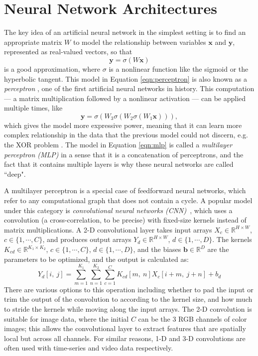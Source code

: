 \section{Neural Network Architectures}

The key idea of an artificial neural network in the simplest setting is to find an appropriate matrix $W$ to model the relationship between variables $\bm{x}$ and $\bm{y}$, represented as real-valued vectors, so that
\begin{equation}\label{eqn:perceptron}
	\bm{y} = \sigma(W \bm{x})
\end{equation}
is a good approximation, where $\sigma$ is a nonlinear function like the sigmoid or the hyperbolic tangent.
This model in Equation \ref{eqn:perceptron} is also known as a \emph{perceptron} \cite{rosenblatt1957perceptron}, one of the first artificial neural networks in history.
This computation --- a matrix multiplication followed by a nonlinear activation --- can be applied multiple times, like
\begin{equation}\label{eqn:mlp}
	\bm{y} = \sigma(W_3\sigma(W_2 \sigma(W_1 \bm{x}))),
\end{equation}
which gives the model more expressive power, meaning that it can learn more complex relationship in the data that the previous model could not discern, e.g. the XOR problem \cite{riedmiller1994mlp}.
The model in Equation \ref{eqn:mlp} is called a \emph{multilayer perceptron (MLP)} in a sense that it is a concatenation of perceptrons, and the fact that it contains multiple layers is why these neural networks are called ``deep".


A multilayer perceptron is a special case of feedforward neural networks, which refer to any computational graph that does not contain a cycle.
A popular model under this category is \emph{convolutional neural networks (CNN)}~\cite{lecun1995lenet}, which uses a convolution (a cross-correlation, to be precise) with fixed-size kernels instead of matrix multiplications.
A 2-D convolutional layer takes input arrays $X_c \in \mathbb{R}^{H \times W}$, $c \in \{ 1, \cdots, C \}$, and produces output arrays $Y_d \in \mathbb{R}^{H \times W}$, $d \in \{ 1, \cdots, D \}$.
The kernels $K_{cd} \in \mathbb{R}^{K_1 \times K_2}$, $c \in \{ 1, \cdots, C \}$, $d \in \{ 1, \cdots, D \}$, and the biases $\bm{b} \in \mathbb{R}^D$ are the parameters to be optimized, and the output is calculated as:
\begin{equation}\label{eqn:convnet}
Y_{d}[i,~j] = \sum_{m=1}^{K_1} \sum_{n=1}^{K_2} \sum_{c=1}^C K_{cd}[m,~n] X_c[i+m,~j+n] + b_d
\end{equation}
There are various options to this operation including whether to pad the input or trim the output of the convolution to according to the kernel size, and how much to stride the kernels while moving along the input arrays.
The 2-D convolution is suitable for image data, where the initial $C$ can be the 3 RGB channels of color images; this allows the convolutional layer to extract features that are spatially local but across all channels.
For similar reasons, 1-D and 3-D convolutions are often used with time-series and video data respectively.

